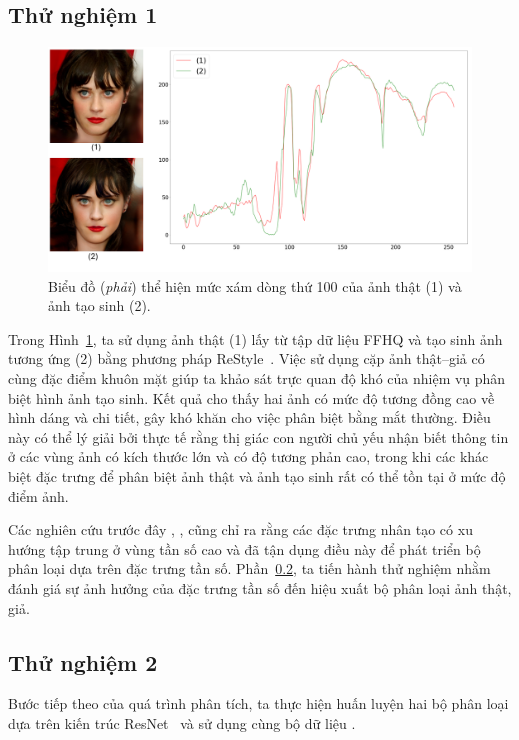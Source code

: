 \subsection{Thử nghiệm 1}
%
\begin{figure}[ht!]
	\centering
	\includegraphics[width=1.0\linewidth]{Images/restyle-encoder-1.png}
	\begin{minipage}{1.0\linewidth}
		\caption{Biểu đồ (\textit{phải}) thể hiện mức xám dòng thứ 100 của ảnh thật (1) và ảnh tạo sinh (2).}
		\label{fig:restyle-encoder-1}
	\end{minipage}
\end{figure}
%
Trong Hình~\ref{fig:restyle-encoder-1}, ta sử dụng ảnh thật (1) lấy từ tập dữ liệu FFHQ và tạo sinh ảnh tương ứng (2) bằng phương pháp ReStyle~\cite{alaluf2021restyle}. 
%
Việc sử dụng cặp ảnh thật–giả có cùng đặc điểm khuôn mặt giúp ta khảo sát trực quan độ khó của nhiệm vụ phân biệt hình ảnh tạo sinh. Kết quả cho thấy hai ảnh có mức độ tương đồng cao về hình dáng và chi tiết, gây khó khăn cho việc phân biệt bằng mắt thường.
%
Điều này có thể lý giải bởi thực tế rằng thị giác con người chủ yếu nhận biết thông tin ở các vùng ảnh có kích thước lớn và có độ tương phản cao, trong khi các khác biệt đặc trưng để phân biệt ảnh thật và ảnh tạo sinh rất có thể tồn tại ở mức độ điểm ảnh.
%
%

Các nghiên cứu trước đây \cite{Jeong2021BiHPFBH}, \cite{Frank2020LeveragingFA}, \cite{Jeong2022FrePGANRD} cũng chỉ ra rằng các đặc trưng nhân tạo có xu hướng tập trung ở vùng tần số cao và đã tận dụng điều này để phát triển bộ phân loại dựa trên đặc trưng tần số. Phần~\ref{ssec:thu_nghiem_2}, ta tiến hành thử nghiệm nhằm đánh giá sự ảnh hưởng của đặc trưng tần số đến hiệu xuất bộ phân loại ảnh thật, giả.

\subsection{Thử nghiệm 2}
\label{ssec:thu_nghiem_2}
Bước tiếp theo của quá trình phân tích, ta thực hiện huấn luyện hai bộ phân loại dựa trên kiến trúc ResNet~\cite{He2015DeepRL} và sử dụng cùng bộ dữ liệu \cite{Krizhevsky2012ImageNetCW}.


